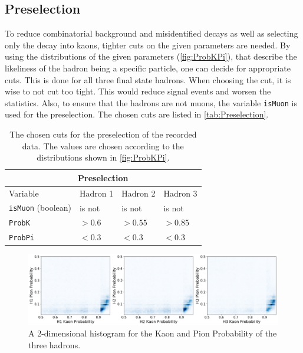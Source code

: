 \subsection{Preselection}

To reduce combinatorial background and misidentified decays as well as selecting only the decay into kaons, tighter cuts on the given parameters are needed. By using the distributions of the given
parameters (\autoref{fig:ProbKPi}), that describe the likeliness of the hadron being a specific particle, one can decide for appropriate cuts. This is done for all three final state
hadrons. When choosing the cut, it is wise to not cut too tight. This would reduce signal events and worsen the statistics. Also, to ensure that the
hadrons are not muons, the variable \texttt{isMuon} is used for the preselection. The chosen cuts are listed
in \autoref{tab:Preselection}.
\begin{table}[h!]
  \centering
    \begin{tabular}{ |p{3cm}||p{3cm}|p{3cm}|p{3cm}|  }
      \hline
      \multicolumn{4}{|c|}{Preselection} \\
      \hline
      Variable & Hadron 1 &Hadron 2 &Hadron 3\\
      \hline
      \texttt{isMuon} (boolean)   & is not &is not&  is not\\
      \texttt{ProbK}&   $> 0.6$  &$> 0.55$   &$> 0.85$\\
      \texttt{ProbPi} & $< 0.3$ & $< 0.3$&  $< 0.3$\\
      \hline   
    \end{tabular}
    \caption{The chosen cuts for the preselection of the recorded data. The values are chosen according to the distributions shown in \autoref{fig:ProbKPi}.}
    \label{tab:Preselection}
\end{table}
\begin{figure}
  \centering
  \includegraphics[width = 1\textwidth]{"content/pics/ProbKPi.png"}

  \caption{A 2-dimensional histogram for the Kaon and Pion Probability of the three hadrons.}
  \label{fig:ProbKPi}
\end{figure}
